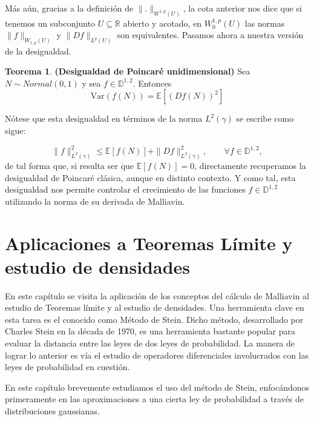 \documentclass[letterpaper,twoside,12pt]{book}
\newcommand{\R}{\mathbb{R}}
\newcommand{\D}{\mathbb{D}}
\newcommand{\E}{\mathbb{E}}
\newcommand{\1}{\mathds{1}}
\theoremstyle{definition}
\theoremstyle{definition}
\newtheorem{teo}{Teorema}
\theoremstyle{definition}
\theoremstyle{definition}
\theoremstyle{definition}
\theoremstyle{definition}
\theoremstyle{definition}
\begin{document}
    Más aún, gracias a la definición de $\|.\|_{W^{1,p}(U)}$, la cota anterior nos dice que si tenemos un subconjunto $U\subseteq \R$ abierto y acotado, en $W_0^{1,p}(U)$ las normas $\|f\|_{W_{1,p}(U)}$ y $\|Df\|_{L^p(U)}$ son equivalentes. Pasamos ahora a nuestra versión de la desigualdad.
    \begin{teo} \textbf{(Desigualdad de Poincaré unidimensional)} Sea $N\sim Normal(0,1)$ y sea $f\in \D^{1,2}$. Entonces
        \[
        \text{Var}\left(f(N)\right)=\E\left[(Df(N))^2\right]    
        \]     
     \end{teo}
Nótese que esta desigualdad en términos de la norma $L^2(\gamma)$ se escribe como sigue:

\[
\|f\|^2_{L^2(\gamma)}\leq \E\left[f(N)\right]+\|Df\|^2_{L^2(\gamma)}, \qquad \forall f\in \D^{1,2},
\]
de tal forma que, si resulta ser que $\E\left[f(N)\right]=0$, directamente recuperamos la desigualdad de Poincaré clásica, aunque en distinto contexto. Y como tal, esta desigualdad nos permite controlar el crecimiento de las funciones $f\in \D^{1,2}$ utilizando la norma de su derivada de Malliavin.




\chapter{Aplicaciones a Teoremas Límite y estudio de densidades}
En este capítulo se visita la aplicación de los conceptos del cálculo de Malliavin al estudio de Teoremas límite y al estudio de densidades. 
Una herramienta clave en esta tarea es el conocido como Método de Stein. 
Dicho método, desarrollado por Charles Stein en la década de 1970, es una herramienta bastante popular para evaluar la distancia entre las leyes de dos leyes de probabilidad. La manera de lograr lo anterior es vía el estudio de operadores diferenciales involucrados con las leyes de probabilidad en cuestión.

En este capítulo brevemente estudiamos el uso del método de Stein, enfocándonos primeramente en las aproximaciones a una cierta ley de probabilidad a través de distribuciones gaussianas.
\end{document}
